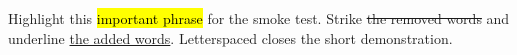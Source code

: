 \documentclass{article}
\begin{document}
Highlight this \hl{important phrase} for the smoke test.
Strike \st{the removed words} and underline \ul{the added words}.
Letterspaced  closes the short demonstration.
\end{document}
